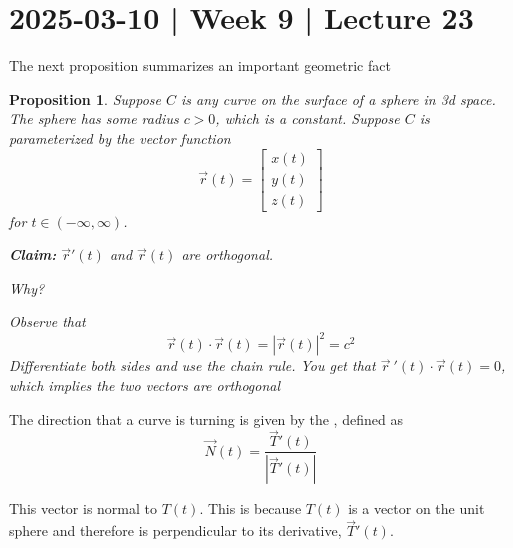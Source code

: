 \documentclass[10pt]{article}
\newtheorem{proposition}[theorem]{Proposition}
\theoremstyle{definition}
\newcommand{\1}[1]{\textbf{1}_{\left[#1\right]}} %
\newcommand{\dempfcolor}[1]{{\color{RoyalBlue}#1}}
\newcommand{\demph}[1]{\dempfcolor{{\sl #1}}}
\begin{document}
\newpage

\section{2025-03-10 | Week 9 | Lecture 23}


The next proposition summarizes an important geometric fact

\begin{proposition}
  Suppose $C$ is any curve on the surface of a sphere in 3d space. The sphere has some radius $c>0$,
  which is a constant. Suppose $C$ is parameterized by the vector function
  \begin{equation*}
    \vec{r}(t) =
    \begin{bmatrix}
      x(t)\\y(t)\\z(t)
    \end{bmatrix}
  \end{equation*}
  for $t\in (-\infty,\infty)$.

  \textbf{Claim:} $\vec{r}'(t)$ and $\vec{r}(t)$ are orthogonal.

  Why?

  Observe that
  \begin{equation*}
    \vec{r}(t)\cdot \vec{r}(t)= |\vec{r}(t)|^{2} = c^{2}
  \end{equation*}
  Differentiate both sides and use the chain rule. You get that $\vec{r}\ '(t)\cdot \vec{r}(t)=0$, which
  implies the two vectors are orthogonal
\end{proposition}

The direction that a curve is turning is given by the \demph{principal unit normal vector $N(t)$},
defined as
\begin{equation*}
  \vec{N}(t) = \frac{\vec{T}'(t)}{|\vec{T}'(t)|}
\end{equation*}

This vector is normal to $T(t).$ This is because $T(t)$ is a vector on the unit sphere and therefore is
perpendicular to its derivative, $\vec{T}'(t)$. 
\end{document}
